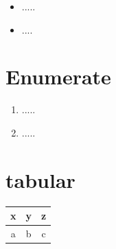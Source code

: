 \begin{itemize}%
\item .....
\item ....
\end{itemize}

\section{Enumerate}
\begin{enumerate}%
\item.....
\item.....
\end{enumerate}


\begin{figure}%
\end{figure}

\section{tabular}
\begin{tabular}{|c|c|c|}\hline%
x & y & z\\ \hline %
a & b &c \\ \hline %
\end{tabular}

%
